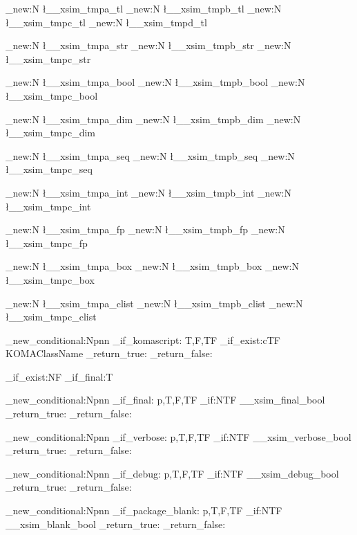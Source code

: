 \tl_new:N    \l__xsim_tmpa_tl
\tl_new:N    \l__xsim_tmpb_tl
\tl_new:N    \l__xsim_tmpc_tl
\tl_new:N    \l__xsim_tmpd_tl

\str_new:N   \l__xsim_tmpa_str
\str_new:N   \l__xsim_tmpb_str
\str_new:N   \l__xsim_tmpc_str

\bool_new:N  \l__xsim_tmpa_bool
\bool_new:N  \l__xsim_tmpb_bool
\bool_new:N  \l__xsim_tmpc_bool

\dim_new:N   \l__xsim_tmpa_dim
\dim_new:N   \l__xsim_tmpb_dim
\dim_new:N   \l__xsim_tmpc_dim

\seq_new:N   \l__xsim_tmpa_seq
\seq_new:N   \l__xsim_tmpb_seq
\seq_new:N   \l__xsim_tmpc_seq

\int_new:N   \l__xsim_tmpa_int
\int_new:N   \l__xsim_tmpb_int
\int_new:N   \l__xsim_tmpc_int

\fp_new:N    \l__xsim_tmpa_fp
\fp_new:N    \l__xsim_tmpb_fp
\fp_new:N    \l__xsim_tmpc_fp

\box_new:N   \l__xsim_tmpa_box
\box_new:N   \l__xsim_tmpb_box
\box_new:N   \l__xsim_tmpc_box

\clist_new:N \l__xsim_tmpa_clist
\clist_new:N \l__xsim_tmpb_clist
\clist_new:N \l__xsim_tmpc_clist


\prg_new_conditional:Npnn \xsim_if_komascript: {T,F,TF}
  {
    \cs_if_exist:cTF {KOMAClassName}
      { \prg_return_true: }
      { \prg_return_false: }
  }


\cs_if_exist:NF \xsim_if_final:T
  {
    \prg_new_conditional:Npnn \xsim_if_final: {p,T,F,TF}
      {
        \bool_if:NTF \g__xsim_final_bool
          { \prg_return_true: }
          { \prg_return_false: }
      }

    \prg_new_conditional:Npnn \xsim_if_verbose: {p,T,F,TF}
      {
        \bool_if:NTF \g__xsim_verbose_bool
          { \prg_return_true: }
          { \prg_return_false: }
      }
  }

\prg_new_conditional:Npnn \xsim_if_debug: {p,T,F,TF}
  {
    \bool_if:NTF \g__xsim_debug_bool
      { \prg_return_true: }
      { \prg_return_false: }
  }

\prg_new_conditional:Npnn \xsim_if_package_blank: {p,T,F,TF}
  {
    \bool_if:NTF \g__xsim_blank_bool
      { \prg_return_true: }
      { \prg_return_false: }
  }

